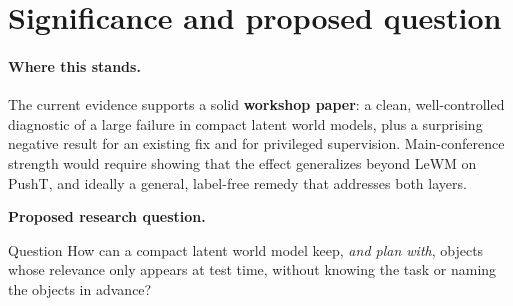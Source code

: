 \documentclass[11pt]{article}
\begin{document}
\section{Significance and proposed question}

\paragraph{Where this stands.} The current evidence supports a solid \textbf{workshop paper}: a clean, well-controlled diagnostic of a large failure in compact latent world models, plus a surprising negative result for an existing fix and for privileged supervision. Main-conference strength would require showing that the effect generalizes beyond LeWM on PushT, and ideally a general, label-free remedy that addresses both layers.

\noindent\textbf{Proposed research question.}\par\vspace{2pt}
\begin{hyp}{Question}
How can a compact latent world model keep, \emph{and plan with}, objects whose relevance only appears at test time, without knowing the task or naming the objects in advance?
\end{hyp}

\vspace{6pt}
\end{document}
